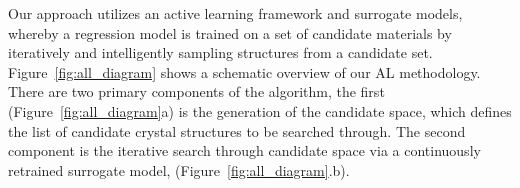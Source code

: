 %
%
%
%



%
%
Our approach utilizes an active learning framework and surrogate models,
whereby a regression model is trained on a set of candidate materials by iteratively and intelligently sampling structures from a candidate set.
%
Figure~\ref{fig:all_diagram} shows a schematic overview of our AL methodology.
%
There are two primary components of the algorithm, the first (Figure~\ref{fig:all_diagram}a) is the generation of the candidate space,
which defines the list of candidate crystal structures to be searched through.
%
The second component is the iterative search through candidate space via a continuously retrained surrogate model, (Figure~\ref{fig:all_diagram}.b).


